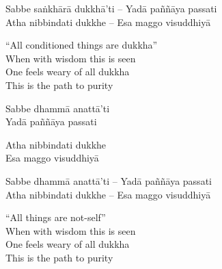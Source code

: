 \else

\begin{verses}
  Sabbe saṅkhārā dukkhā'ti – Yadā paññāya passati\\
  Atha nibbindati dukkhe – Esa maggo visuddhiyā
\end{verses}

\fi

\begin{english-verses}
  ``All conditioned things are dukkha''\\
  When with wisdom this is seen\\
  One feels weary of all dukkha\\
  This is the path to purity
\end{english-verses}

\ifninebythirteen

\clearpage

\begin{pali-hang-verses}
  Sabbe dhammā anattā'ti\\
  Yadā paññāya passati
\end{pali-hang-verses}
\begin{pali-hang-together}
  Atha nibbindati dukkhe\\
  Esa maggo visuddhiyā
\end{pali-hang-together}

\else

\begin{verses}
  Sabbe dhammā anattā'ti – Yadā paññāya passati\\
  Atha nibbindati dukkhe – Esa maggo visuddhiyā
\end{verses}

\fi

\begin{english-verses}
  ``All things are not-self''\ifdigital\makeatletter\hyperlink{endnote36-appendix}\makeatother\fi\\

  When with wisdom this is seen\\
  One feels weary of all dukkha\\
  This is the path to purity
\end{english-verses}

\suttaRef{[Dhp 277-279]}

\ifbfive\clearpage\fi

\ifninebythirteen

